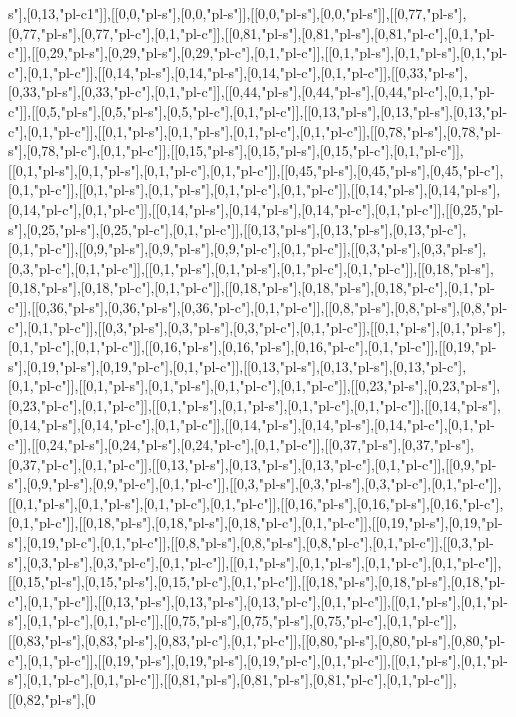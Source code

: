 s"],[0,13,"pl-c1"]],[[0,0,"pl-s"],[0,0,"pl-s"]],[[0,0,"pl-s"],[0,0,"pl-s"]],[[0,77,"pl-s"],[0,77,"pl-s"],[0,77,"pl-c"],[0,1,"pl-c"]],[[0,81,"pl-s"],[0,81,"pl-s"],[0,81,"pl-c"],[0,1,"pl-c"]],[[0,29,"pl-s"],[0,29,"pl-s"],[0,29,"pl-c"],[0,1,"pl-c"]],[[0,1,"pl-s"],[0,1,"pl-s"],[0,1,"pl-c"],[0,1,"pl-c"]],[[0,14,"pl-s"],[0,14,"pl-s"],[0,14,"pl-c"],[0,1,"pl-c"]],[[0,33,"pl-s"],[0,33,"pl-s"],[0,33,"pl-c"],[0,1,"pl-c"]],[[0,44,"pl-s"],[0,44,"pl-s"],[0,44,"pl-c"],[0,1,"pl-c"]],[[0,5,"pl-s"],[0,5,"pl-s"],[0,5,"pl-c"],[0,1,"pl-c"]],[[0,13,"pl-s"],[0,13,"pl-s"],[0,13,"pl-c"],[0,1,"pl-c"]],[[0,1,"pl-s"],[0,1,"pl-s"],[0,1,"pl-c"],[0,1,"pl-c"]],[[0,78,"pl-s"],[0,78,"pl-s"],[0,78,"pl-c"],[0,1,"pl-c"]],[[0,15,"pl-s"],[0,15,"pl-s"],[0,15,"pl-c"],[0,1,"pl-c"]],[[0,1,"pl-s"],[0,1,"pl-s"],[0,1,"pl-c"],[0,1,"pl-c"]],[[0,45,"pl-s"],[0,45,"pl-s"],[0,45,"pl-c"],[0,1,"pl-c"]],[[0,1,"pl-s"],[0,1,"pl-s"],[0,1,"pl-c"],[0,1,"pl-c"]],[[0,14,"pl-s"],[0,14,"pl-s"],[0,14,"pl-c"],[0,1,"pl-c"]],[[0,14,"pl-s"],[0,14,"pl-s"],[0,14,"pl-c"],[0,1,"pl-c"]],[[0,25,"pl-s"],[0,25,"pl-s"],[0,25,"pl-c"],[0,1,"pl-c"]],[[0,13,"pl-s"],[0,13,"pl-s"],[0,13,"pl-c"],[0,1,"pl-c"]],[[0,9,"pl-s"],[0,9,"pl-s"],[0,9,"pl-c"],[0,1,"pl-c"]],[[0,3,"pl-s"],[0,3,"pl-s"],[0,3,"pl-c"],[0,1,"pl-c"]],[[0,1,"pl-s"],[0,1,"pl-s"],[0,1,"pl-c"],[0,1,"pl-c"]],[[0,18,"pl-s"],[0,18,"pl-s"],[0,18,"pl-c"],[0,1,"pl-c"]],[[0,18,"pl-s"],[0,18,"pl-s"],[0,18,"pl-c"],[0,1,"pl-c"]],[[0,36,"pl-s"],[0,36,"pl-s"],[0,36,"pl-c"],[0,1,"pl-c"]],[[0,8,"pl-s"],[0,8,"pl-s"],[0,8,"pl-c"],[0,1,"pl-c"]],[[0,3,"pl-s"],[0,3,"pl-s"],[0,3,"pl-c"],[0,1,"pl-c"]],[[0,1,"pl-s"],[0,1,"pl-s"],[0,1,"pl-c"],[0,1,"pl-c"]],[[0,16,"pl-s"],[0,16,"pl-s"],[0,16,"pl-c"],[0,1,"pl-c"]],[[0,19,"pl-s"],[0,19,"pl-s"],[0,19,"pl-c"],[0,1,"pl-c"]],[[0,13,"pl-s"],[0,13,"pl-s"],[0,13,"pl-c"],[0,1,"pl-c"]],[[0,1,"pl-s"],[0,1,"pl-s"],[0,1,"pl-c"],[0,1,"pl-c"]],[[0,23,"pl-s"],[0,23,"pl-s"],[0,23,"pl-c"],[0,1,"pl-c"]],[[0,1,"pl-s"],[0,1,"pl-s"],[0,1,"pl-c"],[0,1,"pl-c"]],[[0,14,"pl-s"],[0,14,"pl-s"],[0,14,"pl-c"],[0,1,"pl-c"]],[[0,14,"pl-s"],[0,14,"pl-s"],[0,14,"pl-c"],[0,1,"pl-c"]],[[0,24,"pl-s"],[0,24,"pl-s"],[0,24,"pl-c"],[0,1,"pl-c"]],[[0,37,"pl-s"],[0,37,"pl-s"],[0,37,"pl-c"],[0,1,"pl-c"]],[[0,13,"pl-s"],[0,13,"pl-s"],[0,13,"pl-c"],[0,1,"pl-c"]],[[0,9,"pl-s"],[0,9,"pl-s"],[0,9,"pl-c"],[0,1,"pl-c"]],[[0,3,"pl-s"],[0,3,"pl-s"],[0,3,"pl-c"],[0,1,"pl-c"]],[[0,1,"pl-s"],[0,1,"pl-s"],[0,1,"pl-c"],[0,1,"pl-c"]],[[0,16,"pl-s"],[0,16,"pl-s"],[0,16,"pl-c"],[0,1,"pl-c"]],[[0,18,"pl-s"],[0,18,"pl-s"],[0,18,"pl-c"],[0,1,"pl-c"]],[[0,19,"pl-s"],[0,19,"pl-s"],[0,19,"pl-c"],[0,1,"pl-c"]],[[0,8,"pl-s"],[0,8,"pl-s"],[0,8,"pl-c"],[0,1,"pl-c"]],[[0,3,"pl-s"],[0,3,"pl-s"],[0,3,"pl-c"],[0,1,"pl-c"]],[[0,1,"pl-s"],[0,1,"pl-s"],[0,1,"pl-c"],[0,1,"pl-c"]],[[0,15,"pl-s"],[0,15,"pl-s"],[0,15,"pl-c"],[0,1,"pl-c"]],[[0,18,"pl-s"],[0,18,"pl-s"],[0,18,"pl-c"],[0,1,"pl-c"]],[[0,13,"pl-s"],[0,13,"pl-s"],[0,13,"pl-c"],[0,1,"pl-c"]],[[0,1,"pl-s"],[0,1,"pl-s"],[0,1,"pl-c"],[0,1,"pl-c"]],[[0,75,"pl-s"],[0,75,"pl-s"],[0,75,"pl-c"],[0,1,"pl-c"]],[[0,83,"pl-s"],[0,83,"pl-s"],[0,83,"pl-c"],[0,1,"pl-c"]],[[0,80,"pl-s"],[0,80,"pl-s"],[0,80,"pl-c"],[0,1,"pl-c"]],[[0,19,"pl-s"],[0,19,"pl-s"],[0,19,"pl-c"],[0,1,"pl-c"]],[[0,1,"pl-s"],[0,1,"pl-s"],[0,1,"pl-c"],[0,1,"pl-c"]],[[0,81,"pl-s"],[0,81,"pl-s"],[0,81,"pl-c"],[0,1,"pl-c"]],[[0,82,"pl-s"],[0